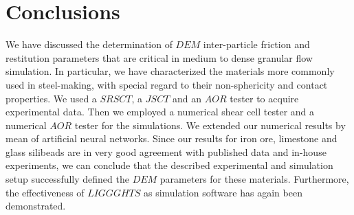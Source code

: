 \section{Conclusions}
\label{sec:conclusions}

We have discussed the determination of $DEM$ inter-particle friction and restitution parameters that are critical in medium to dense granular flow simulation.
In particular, we have characterized the materials more commonly used in steel-making, with special regard to their non-sphericity and contact properties.
We used a $SRSCT$, a $JSCT$ and an $AOR$ tester to acquire experimental data. 
Then we employed a numerical shear cell tester and a numerical $AOR$ tester for the simulations.
We extended our numerical results by mean of artificial neural networks.
Since our results for iron ore, limestone and glass silibeads are in very good agreement with published data and in-house experiments, we can conclude that the described experimental and simulation setup successfully defined the $DEM$ parameters for these materials. 
Furthermore, the effectiveness of $LIGGGHTS$ as simulation software has again been demonstrated.\\

